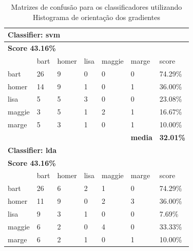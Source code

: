 \documentclass[paper=a4, fontsize=11pt]{scrartcl} %
\numberwithin{equation}{section} %
\numberwithin{figure}{section} %
\numberwithin{table}{section} %
\begin{document}
\begin{table}[!htb]
\centering
\caption{Matrizes de confusão para os classificadores utilizando Histograma de orientação dos gradientes}
\label{tbl:hog}
\begin{tabular}{l|l|l|l|l|l|l} \hline
\multicolumn{7}{l}{\textbf{Classifier: svm}}                                                \\ \hline
\multicolumn{7}{l}{\textbf{Score 43.16\%}}                                                  \\ \hline
          & bart      & homer     & lisa      & maggie    & marge          & score            \\ \hline
bart      & 26        & 9         & 0         & 0         & 0              & 74.29\%          \\ \hline
homer     & 14        & 9         & 1         & 0         & 1              & 36.00\%          \\ \hline
lisa      & 5         & 5         & 3         & 0         & 0              & 23.08\%          \\ \hline
maggie    & 3         & 5         & 1         & 2         & 1              & 16.67\%          \\ \hline
marge     & 5         & 3         & 1         & 0         & 1              & 10.00\%          \\ \hline
          &           &           &           &           & \textbf{media} & \textbf{32.01\%} \\ \hline
\multicolumn{7}{l}{\textbf{Classifier: lda}}                                                \\ \hline
\multicolumn{7}{l}{\textbf{Score 43.16\%}}                                                  \\ \hline
          & bart      & homer     & lisa      & maggie    & marge          & score            \\ \hline
bart      & 26        & 6         & 2         & 1         & 0              & 74.29\%          \\ \hline
homer     & 11        & 9         & 0         & 2         & 3              & 36.00\%          \\ \hline
lisa      & 9         & 3         & 1         & 0         & 0              & 7.69\%           \\ \hline
maggie    & 6         & 2         & 0         & 4         & 0              & 33.33\%          \\ \hline
marge     & 6         & 2         & 1         & 0         & 1              & 10.00\%          \\ \hline

\end{tabular}
\end{table}
\end{document}
